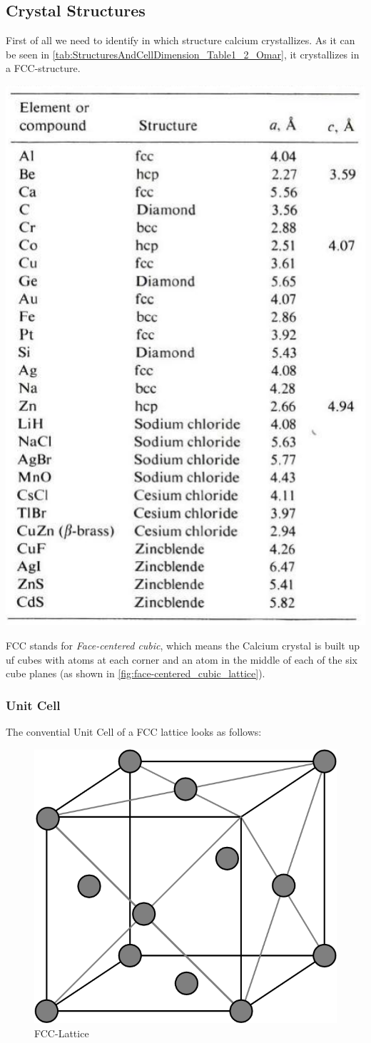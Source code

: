 \subsection{Crystal Structures} \label{chap1}

First of all we need to identify in which structure calcium crystallizes.
As it can be seen in \autoref{tab:StructuresAndCellDimension_Table1_2_Omar},
it crystallizes in a FCC-structure.

\begin{table}[H]
	\centering
	\caption{Structures and Cell Dimensions of some Elements and Compounds,\\
	Elementary Solid State Physics \cite{elementary_SSP}, p. 18}
	\includegraphics[width=0.5\linewidth]{Graphics/Chapter1/StructuresAndCellDimension_Table1_2_Omar}
	\label{tab:StructuresAndCellDimension_Table1_2_Omar}
\end{table}

FCC stands for \textit{Face-centered cubic}, which means 
the Calcium crystal is built up uf cubes with atoms at each
corner and an atom in the middle of each of the six cube planes
(as shown in \autoref{fig:face-centered_cubic_lattice}).

\subsubsection*{Unit Cell}
The convential Unit Cell of a FCC lattice looks as follows:

\begin{figure}[H]
	\centering
	\includegraphics[width=0.4\linewidth]{Graphics/Chapter1/face-centered_cubic_lattice.png}
	\caption{FCC-Lattice}
	\label{fig:face-centered_cubic_lattice}
\end{figure}

